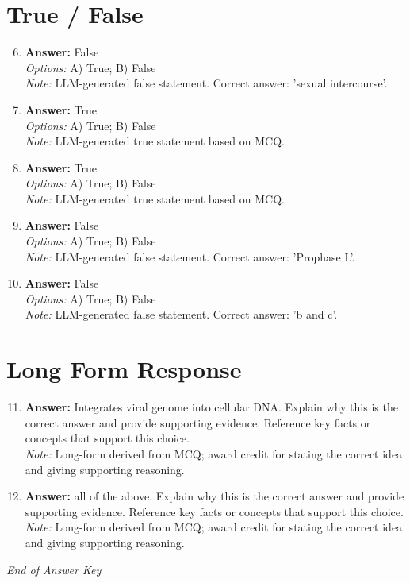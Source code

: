 \documentclass[12pt]{article}
\begin{document}
\section*{True / False}
\begin{enumerate}[label=\arabic*.]
\setcounter{enumi}{5}
\item \textbf{Answer:} False
\\ \textit{Options:} A) True; B) False
\\ \textit{Note:} LLM-generated false statement. Correct answer: 'sexual intercourse'.
\item \textbf{Answer:} True
\\ \textit{Options:} A) True; B) False
\\ \textit{Note:} LLM-generated true statement based on MCQ.
\item \textbf{Answer:} True
\\ \textit{Options:} A) True; B) False
\\ \textit{Note:} LLM-generated true statement based on MCQ.
\item \textbf{Answer:} False
\\ \textit{Options:} A) True; B) False
\\ \textit{Note:} LLM-generated false statement. Correct answer: 'Prophase I.'.
\item \textbf{Answer:} False
\\ \textit{Options:} A) True; B) False
\\ \textit{Note:} LLM-generated false statement. Correct answer: 'b and c'.
\end{enumerate}

\section*{Long Form Response}
\begin{enumerate}[label=\arabic*.]
\setcounter{enumi}{10}
\item \textbf{Answer:} Integrates viral genome into cellular DNA. Explain why this is the correct answer and provide supporting evidence. Reference key facts or concepts that support this choice.
\\ \textit{Note:} Long-form derived from MCQ; award credit for stating the correct idea and giving supporting reasoning.
\item \textbf{Answer:} all of the above. Explain why this is the correct answer and provide supporting evidence. Reference key facts or concepts that support this choice.
\\ \textit{Note:} Long-form derived from MCQ; award credit for stating the correct idea and giving supporting reasoning.
\end{enumerate}

\vfill
\noindent\textit{End of Answer Key}
\end{document}
